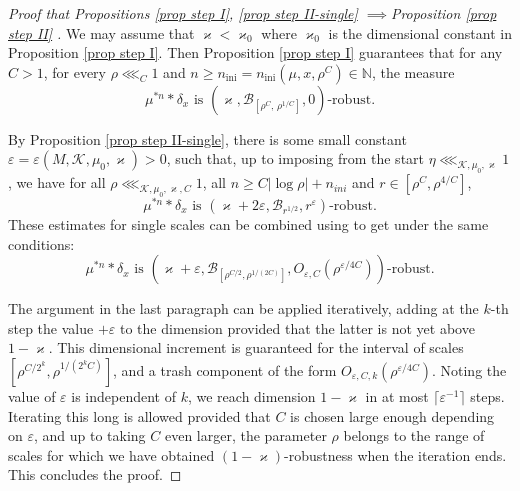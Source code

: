 \documentclass[11pt, leqno, fleqn]{amsart}
\def\eps{\varepsilon}
\def\cB{          \mathcal B}
\def\clb{   \color{black}}
\def \N{{\mathbb N}}
\DeclareMathOperator{\ini}{ini}
\newcommand{\cK}{{\mathcal K}}
\theoremstyle{definition}
\theoremstyle{definition}
\begin{document}
\begin{proof}[Proof that Propositions \ref{prop step I}, \ref{prop step II-single} $\implies  $Proposition \ref{prop step II} ]

 We may assume that $\varkappa <\varkappa_{0}$ where $\varkappa_{0}$ is the dimensional constant in Proposition \ref{prop step I}. Then Proposition \ref{prop step I} guarantees that for any $C>1$, for every $\rho\lll_{C}1$ and $n\geq n_{\ini}=n_{\ini}(\mu, x, \rho^C)\in \N$, the measure
\[\text{{$\mu^{*n}*\delta_{x}$} is $(\varkappa, \cB_{[\rho^C, \,\rho^{1/C}]}, 0)$-robust}. \]

By Proposition \ref{prop step II-single},  there is some small constant $\eps=\eps(M, \cK, \mu_{0}, \varkappa)>0$, such that, up to imposing from the start $\eta\lll_{\cK, \mu_{0}, \varkappa}1$, we have for {all} $\rho\lll_{\cK, \mu_{0}, \varkappa, C}1$, all $n\geq C  |\log \rho| +n_{ini}$ and $r\in [\rho^{C}, \rho^{4/C}]$,
\[\text{{$\mu^{*n}*\delta_x$} is $(\varkappa+2\eps, \cB_{r^{1/2}}, r^{\eps})$-robust}. \]
These estimates for single scales can be combined using \cite[Lemma 4.5]{BH1} to get under the same conditions:
\[\text{{$\mu^{*n}*\delta_x$} is $(\varkappa+\eps, \cB_{[\rho^{C/2}, \rho^{1/(2C)}]}, O_{\eps,C}(\rho^{\eps/4C}))$-robust}. \]

The argument in the last paragraph can be applied iteratively, adding at the  $k$-th step  the value $+\eps$ to the dimension provided that the latter is not yet above $1-\varkappa$. This dimensional increment is guaranteed for the interval of scales  $[\rho^{C/2^k}, \rho^{1/(2^kC)}]$, and  a trash component of the form $O_{\eps,C,k}(\rho^{\eps/4C})$.
Noting the value of $\eps$ is independent of $k$, we reach dimension $1-\varkappa$ in at most  $\lceil \eps^{-1} \rceil$ steps. Iterating this long is allowed provided that $C$ is chosen large enough depending on $\eps$, and up to taking $C$ even larger, the parameter $\rho$ belongs to the range of scales for which we have obtained $(1 - \varkappa)$-robustness when the iteration ends.
This concludes the proof.
\end{proof}


	


 \clb
\bigskip
  
\end{document}
